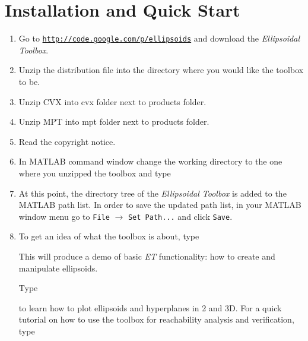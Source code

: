 \section{Installation and Quick Start}
\begin{enumerate}
\item Go to
\newline
{\tt \url{http://code.google.com/p/ellipsoids}}
\newline
and download the {\it Ellipsoidal Toolbox}.
\item Unzip the distribution file into the directory where you would like
the toolbox to be.
\item Unzip CVX into cvx folder next to products folder.
\item Unzip MPT into mpt folder next to products folder.
\item Read the copyright notice.
\item In MATLAB command window change the working directory to the one where
you unzipped the toolbox and type
\item At this point, the directory tree of the {\it Ellipsoidal Toolbox} is
added to the MATLAB path list. In order to save the updated path list,
in your MATLAB window menu go to {\tt File} $\rightarrow$ {\tt Set Path...} and
click {\tt Save}.
\item To get an idea of what the toolbox is about, type

This will produce a demo of basic {\it ET} functionality: how to create
and manipulate ellipsoids.

Type

to learn how to plot ellipsoids and hyperplanes in 2 and 3D.
\newline
For a quick tutorial on how to use the toolbox for reachability analysis
and verification, type

\end{enumerate}

